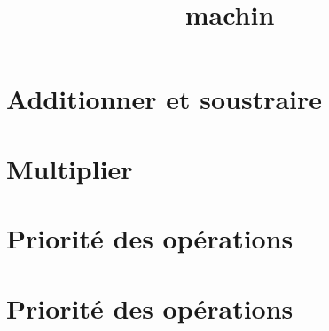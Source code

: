 \documentclass[12pt,a4paper]{article}
\date{}
\title{machin}
\begin{document}
%
%

%

%
\section{Additionner et soustraire}
%


\newpage

\section{Multiplier}



\newpage

\section{Priorité des opérations}



\setcounter{section}{2}

\section{Priorité des opérations}


%
%
%
%
%
\end{document}
